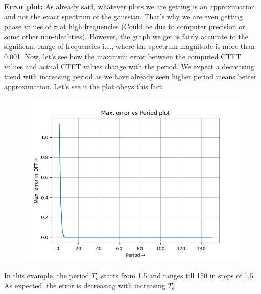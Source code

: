 \documentclass[12pt, a4paper]{article}
\begin{document}
\textbf{Error plot:} As already said, whatever plots we are getting is an approximation and not the exact spectrum of the gaussian. That's why we are even getting phase values of $\pi$ at high frequencies (Could be due to computer precision or some other non-idealities). However, the graph we get is fairly accurate to the significant range of frequencies i.e., where the spectrum magnitude is more than 0.001. Now, let's see how the maximum error between the computed CTFT values and actual CTFT values change with the period. We expect a decreasing trend with increasing period as we have already seen higher period means better approximation. Let's see if the plot obeys this fact:
\begin{figure}[H]
    \centering
    \includegraphics[scale = 0.8]{Figure_16.png}
    \label{fig:sample}
\end{figure}
\begin{center}
    In this example, the period $T_{o}$ starts from 1.5 and ranges till 150 in steps of 1.5. As expected, the error is decreasing with increasing $T_{o}$
\end{center}
\end{document}
